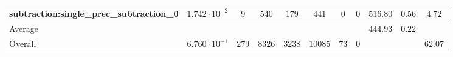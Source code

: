 \begin{tabular}{|l|c|c|c|c|c|c|c|c|c|c|}
subtraction:single\_prec\_subtraction\_0         & $ 1.742 \cdot 10^{-2} $ & $ 9      $ & $ 540  $ & $ 179  $ & $ 441   $ & $ 0  $ & $ 0 $ & $ 516.80      $ & $ 0.56    $ & $ 4.72    $ \\
\hline
Average                                          & $                     $ & $        $ & $      $ & $      $ & $       $ & $    $ & $   $ & $ 444.93      $ & $ 0.22    $ & $         $ \\
\hline
Overall                                          & $ 6.760 \cdot 10^{-1} $ & $ 279    $ & $ 8326 $ & $ 3238 $ & $ 10085 $ & $ 73 $ & $ 0 $ & $             $ & $         $ & $ 62.07   $ \\
\hline
\end{tabular}
